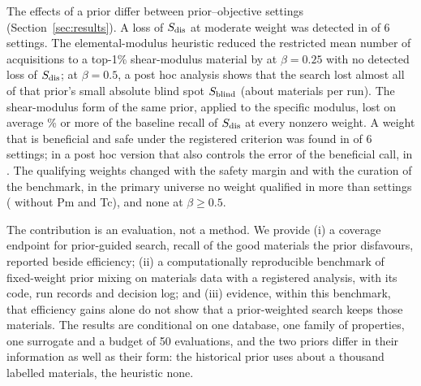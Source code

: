 The effects of a prior differ between prior--objective settings (Section~\ref{sec:results}). A loss of $S_{\mathrm{dis}}$ at moderate weight
was detected in  of 6 settings. The elemental-modulus heuristic reduced the restricted mean number of acquisitions to
a top-1\% shear-modulus material by  at $\beta=0.25$ with no detected loss of
$S_{\mathrm{dis}}$; at $\beta=0.5$, a post hoc analysis shows that the search lost almost all of that prior's small absolute blind spot
$S_{\mathrm{blind}}$ (about  materials per run). The shear-modulus form of the same
prior, applied to the specific modulus, lost on average \% or more of
the baseline recall of $S_{\mathrm{dis}}$ at every nonzero weight. A weight
that is beneficial and safe under the registered criterion was found in  of 6 settings; in a post hoc
version that also controls the error of the beneficial call, in . The qualifying weights changed
with the safety margin and with the curation of the benchmark, in the primary universe no weight qualified in more than
 settings ( without Pm and Tc), and none at $\beta\ge0.5$.

The contribution is an evaluation, not a method. We provide (i) a coverage endpoint for prior-guided search, recall of the good
materials the prior disfavours, reported beside efficiency; (ii) a computationally reproducible benchmark of fixed-weight prior
mixing on materials data with a registered analysis, with its code, run records and decision log; and (iii) evidence, within this benchmark, that efficiency
gains alone do not show that a prior-weighted search keeps those materials. The results are conditional on one database, one
family of properties, one surrogate and a budget of 50 evaluations, and the two priors differ in their information as well as
their form: the historical prior uses about a thousand labelled materials, the heuristic none.

